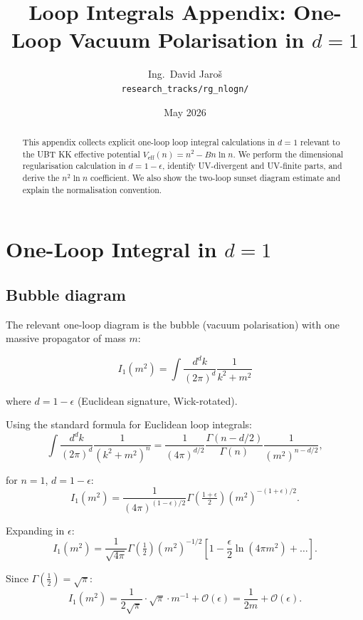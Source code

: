 \documentclass[11pt,a4paper]{article}
\title{Loop Integrals Appendix: One-Loop Vacuum Polarisation in $d = 1$}
\author{Ing.\ David Jaro\v{s}\\
\small \texttt{research\_tracks/rg\_nlogn/}}
\date{May 2026}
\begin{document}
\maketitle

\begin{abstract}
This appendix collects explicit one-loop loop integral calculations in
$d = 1$ relevant to the UBT KK effective potential $V_\mathrm{eff}(n) = n^2 - Bn\ln n$.
We perform the dimensional regularisation calculation in $d = 1 - \epsilon$,
identify UV-divergent and UV-finite parts, and derive the $n^2\ln n$ coefficient.
We also show the two-loop sunset diagram estimate and explain the normalisation convention.
\end{abstract}

\section{One-Loop Integral in $d = 1$}

\subsection{Bubble diagram}

The relevant one-loop diagram is the bubble (vacuum polarisation) with one
massive propagator of mass $m$:

\[
  I_1(m^2) = \int \frac{d^dk}{(2\pi)^d} \frac{1}{k^2 + m^2}
\]

where $d = 1 - \epsilon$ (Euclidean signature, Wick-rotated).

Using the standard formula for Euclidean loop integrals:
\[
  \int \frac{d^dk}{(2\pi)^d} \frac{1}{(k^2 + m^2)^n}
  = \frac{1}{(4\pi)^{d/2}} \frac{\Gamma(n - d/2)}{\Gamma(n)}
    \frac{1}{(m^2)^{n-d/2}},
\]

for $n = 1$, $d = 1 - \epsilon$:
\[
  I_1(m^2) = \frac{1}{(4\pi)^{(1-\epsilon)/2}}
    \Gamma\!\left(\tfrac{1+\epsilon}{2}\right) (m^2)^{-(1+\epsilon)/2}.
\]

Expanding in $\epsilon$:
\[
  I_1(m^2) = \frac{1}{\sqrt{4\pi}}
  \Gamma\!\left(\tfrac12\right)(m^2)^{-1/2}
  \left[1 - \frac{\epsilon}{2}\ln(4\pi m^2) + \ldots\right].
\]

Since $\Gamma(\frac12) = \sqrt{\pi}$:
\[
  I_1(m^2) = \frac{1}{2\sqrt{\pi}} \cdot \sqrt{\pi} \cdot m^{-1}
  + \mathcal{O}(\epsilon)
  = \frac{1}{2m} + \mathcal{O}(\epsilon).
\]
\end{document}
